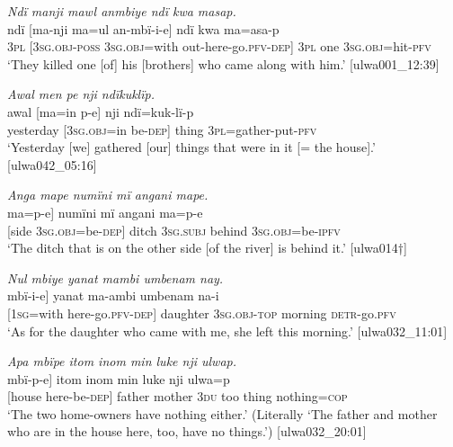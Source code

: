 \ea%
    \label{ex:complex:92}
          \textit{Ndï manji mawl anmbiye ndï kwa masap.}\\
\gll    ndï  [ma-nji      ma=ul      an-mbï-i-e]      ndï  kwa     ma=asa-p\\
    3\textsc{pl}  [3\textsc{sg.obj-poss}  3\textsc{sg.obj}=with  out-here-go.\textsc{pfv-dep]}  3\textsc{pl}  one    3\textsc{sg.obj}=hit-\textsc{pfv}\\
\glt `They killed one [of] his [brothers] who came along with him.’ [ulwa001\_12:39]
\z

\ea%
    \label{ex:complex:93}
          \textit{Awal men pe nji ndïkuklïp.}\\
\gll    awal    [ma=in      p-e]    nji    ndï=kuk-lï-p\\
    yesterday  [3\textsc{sg.obj}=in  be\textsc{{}-dep]} thing  3\textsc{pl}=gather-put-\textsc{pfv}\\
\glt `Yesterday [we] gathered [our] things that were in it [= the house].’ [ulwa042\_05:16]
\z

\ea%
    \label{ex:complex:94}
          \textit{Anga mape numïni mï angani mape.}\\
\gll    {[anga}  {ma=p-e]}      numïni  mï      angani  ma=p-e\\
    {[side}  3\textsc{sg.obj}=be\textsc{{}-dep]} ditch  \textsc{3sg.subj}  behind  \textsc{3sg.obj}=be\textsc{{}-ipfv}\\
\glt `The ditch that is on the other side [of the river] is behind it.’ [ulwa014†]
\z

\ea%
    \label{ex:complex:95}
          \textit{Nul mbiye yanat mambi umbenam nay.}\\
\gll    {[nï=ul}    {mbï-i-e]}      yanat    ma-ambi    umbenam na-i\\
    {[1\textsc{sg}=with}  here-go.\textsc{pfv-dep]}  daughter  3\textsc{sg.obj-top}  morning    \textsc{detr{}-}go.\textsc{pfv}\\
\glt `As for the daughter who came with me, she left this morning.’ [ulwa032\_11:01]
\z

\ea%
    \label{ex:complex:96}
          \textit{Apa mbïpe itom inom min luke nji ulwap.}\\
\gll    {[apa}  {mbï-p-e]}    itom  inom  min  luke  nji ulwa=p\\
    {[house}  here-be\textsc{{}-dep]} father  mother  \textsc{3du}  too    thing    nothing=\textsc{cop}\\
\glt `The two home-owners have nothing either.’ (Literally ‘The father and mother who are in the house here, too, have no things.’) [ulwa032\_20:01]
\z

